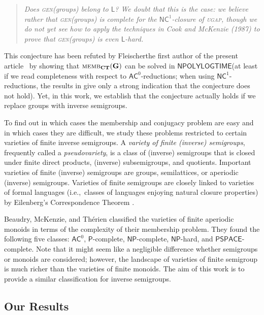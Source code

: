 \documentclass[anonymous,letter,UKenglish,cleveref,autoref,thm-restate]{lipics-v2021}
\newcommand{\ie}{i.e.,~}
\newcommand{\Ptime}{\ensuremath{\mathsf{P}}\xspace}
\newcommand{\NPOLYLOGTIME}{\ensuremath{\mathsf{NPOLYLOGTIME}}\xspace}
\newcommand{\ACz}{\ensuremath{\mathsf{AC}^0}\xspace}
\newcommand{\NC}{\ensuremath{\mathsf{NC}}\xspace}
\newcommand{\LOGSPACE}{\ensuremath{\mathsf{L}}\xspace}
\newcommand{\NP}{\ensuremath{\mathsf{NP}}\xspace}
\newcommand{\PSPACE}{\ensuremath{\mathsf{PSPACE}}\xspace}
\newcommand{\vG}{\ensuremath{\mathbf{G}}}
\theoremstyle{plain}
\theoremstyle{plain}
\newcommand{\dMemb}[2][]{\textup{\textsc{memb${}_{\mathbf{#1}}\expandafter\ifx\expandafter\relax\detokenize{#2}\relax\else(#2)\fi$}}}
\newcommand{\prob}[1]{\textup{\textsc{#1}}\xspace}
\newcommand{\dUGAP}{\prob{ugap}}
\begin{document}
\begin{quote}
	\em	Does \textup{\textsc{gen}(groups)} belong to \LOGSPACE? We doubt that this is the case: we believe rather that \textup{\textsc{gen}(groups)} is complete for the $\NC^1$-closure of \dUGAP, though we do not
  yet see how to apply the techniques in Cook and McKenzie (1987) to prove that \textup{\textsc{gen}(groups)} is even \LOGSPACE-hard.
\end{quote} 

This conjecture has been refuted by \ifAnonimous Fleischer\else the first author of the present article\fi~\cite{Fleischer19diss,Fleischer22} by showing that $\dMemb[CT]{\vG}$ can be solved in \NPOLYLOGTIME  (at least if we read completeness with respect to \ACz-reductions; when using $\NC^1$-reductions, the results in \cite{Fleischer19diss,Fleischer22} give only a strong indication that the conjecture does not hold).
Yet, in this work, we establish that the conjecture actually holds if we replace groups with inverse semigroups.

\medbreak

To find out in which cases the membership and conjugacy problem are easy and in which cases they are difficult, we study these problems restricted to certain varieties of finite inverse semigroups.
A \emph{variety of finite (inverse) semigroups}, frequently called a \emph{pseudovariety}, is a class of (inverse) semigroups that is closed under finite direct products, (inverse) subsemigroups, and quotients.
Important varieties of finite (inverse) semigroups are groups, semilattices, or aperiodic (inverse) semigroups.
Varieties of finite semigroups are closely linked to varieties of formal languages (\ie classes of languages enjoying natural closure properties) by Eilenberg's Correspondence Theorem \cite{eil76}.

Beaudry, McKenzie, and Thérien \cite{BeaudryMT92} classified the varieties of finite aperiodic monoids in terms of the complexity of their membership problem.
They found the following five classes: \ACz, \Ptime-complete, \NP-complete, \NP-hard, and \PSPACE-complete. 
Note that it might seem like a negligible difference whether semigroups or monoids are considered; however, the landscape of varieties of finite semigroup is much richer than the varieties of finite monoids. 
The aim of this work is to provide a similar classification for inverse semigroups.





\subsection{Our Results}\label{sec:results}
\end{document}
